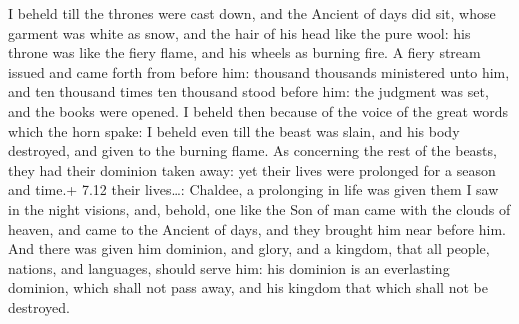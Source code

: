  I beheld till the thrones were cast down, and the Ancient
of days did sit, whose garment was white as snow, and the hair of his
head like the pure wool: his throne was like the fiery flame, and his
wheels as burning fire.  A fiery stream issued and came
forth from before him: thousand thousands ministered unto him, and ten
thousand times ten thousand stood before him: the judgment was set, and
the books were opened.  I beheld then because of the voice
of the great words which the horn spake: I beheld even till the beast
was slain, and his body destroyed, and given to the burning flame.
 As concerning the rest of the beasts, they had their
dominion taken away: yet their lives were prolonged for a season and
time.+ 7.12 their lives\ldots: Chaldee, a prolonging in life was given
them  I saw in the night visions, and, behold, one like the
Son of man came with the clouds of heaven, and came to the Ancient of
days, and they brought him near before him.  And there was
given him dominion, and glory, and a kingdom, that all people, nations,
and languages, should serve him: his dominion is an everlasting
dominion, which shall not pass away, and his kingdom that which shall
not be destroyed.

